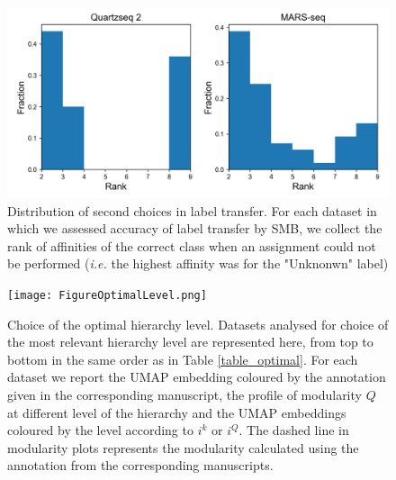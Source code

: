 \documentclass[11pt, titlepage, twoside]{article}
\begin{document}
\begin{figure}[htbp]
\centering
\includegraphics[keepaspectratio,width=\textwidth,height=0.75\textheight]{hist_label_second.png}
\caption[]{Distribution of second choices in label transfer. For each dataset in which we assessed accuracy of label transfer by SMB, we collect the rank of affinities of the correct class when an assignment could not be performed (\emph{i.e.} the highest affinity was for the "Unknonwn" label)  }\label{hist_label_second}
\end{figure}
\clearpage

\begin{figure}[htbp]
\centering
\texttt{[image: FigureOptimalLevel.png]}
\caption[]{Choice of the optimal hierarchy level. Datasets analysed for choice of the most relevant hierarchy level are represented here, from top to bottom in the same order as in Table \ref{table_optimal}. For each dataset we report the UMAP embedding coloured by the annotation given in the corresponding manuscript, the profile of modularity $Q$ at different level of the hierarchy and the UMAP embeddings coloured by the level according to $i^k$ or $i^Q$. The dashed line in modularity plots represents the modularity calculated using the annotation from the corresponding manuscripts.}\label{FigureOptimalLevel}
\end{figure}
\end{document}
